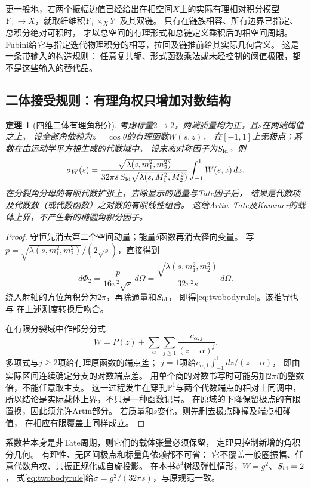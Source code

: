 \documentclass[11pt,a4paper]{ctexart}
\theoremstyle{cnplain}\newtheorem{theorem}{定理}[section]
\theoremstyle{definition}\newtheorem{definition}[theorem]{定义}
\theoremstyle{remark}\newtheorem{remark}[theorem]{注}
\begin{document}
更一般地，若两个振幅边值已经给出在相空间$X$上的实际有理相对积分模型
$Y_\pm\to X$，就取纤维积$Y_+\times_XY_-$及其双链。
只有在链族相容、所有边界已指定、总积分绝对可积时，
才以总空间的有理形式和总链定义乘积后的相空间周期。
Fubini给它与指定迭代物理积分的相等，拉回及链推前给其实际几何含义。
这是一条带输入的构造规则：
任意复共轭、形式函数乘法或未经控制的阈值极限，都不是这些输入的替代品。

\subsection{二体接受规则：有理角权只增加对数结构}
\begin{theorem}[四维二体有理角积分]\label{thm:twobodyrational}
考虑标量$2\to2$，两端质量均为正，且$s$在两端阈值之上。
设全部角依赖为$z=\cos\theta$的有理函数$W(s,z)$，
在$[-1,1]$上无极点；系数在由运动学平方根生成的代数域中。
设末态对称因子为$S_{\rm id}$。则
\begin{equation}\label{eq:twobodyrule}
 \sigma_W(s)=
 \frac{\sqrt{\lambda(s,m_1^2,m_2^2)}}
 {32\pi s\,S_{\rm id}\sqrt{\lambda(s,M_1^2,M_2^2)}}
 \int_{-1}^1 W(s,z)\,dz .
\end{equation}
在分裂角分母的有限代数扩张上，去除显示的通量与Tate因子后，
结果是代数项及代数数（或代数函数）之对数的有限线性组合。
这给Artin--Tate及Kummer的载体上界，不产生新的椭圆角积分因子。
\end{theorem}
\begin{proof}
守恒先消去第二个空间动量；能量$\delta$函数再消去径向变量。
写$p=\sqrt{\lambda(s,m_1^2,m_2^2)}/(2\sqrt s)$，直接得到
\[
 d\Phi_2=\frac{p}{16\pi^2\sqrt s}\,d\Omega
        =\frac{\sqrt{\lambda(s,m_1^2,m_2^2)}}{32\pi^2s}\,d\Omega .
\]
绕入射轴的方位角积分为$2\pi$，再除通量和$S_{\rm id}$，
即得\eqref{eq:twobodyrule}。该推导也与
\cite[式(49.16)--(49.18)]{PDGphase}在上述测度转换后吻合。

在有限分裂域中作部分分式
\[
 W=P(z)+\sum_{\alpha}\sum_{j\ge1}\frac{c_{\alpha,j}}{(z-\alpha)^j}.
\]
多项式与$j\ge2$项给有理原函数的端点差；
$j=1$项给$c_{\alpha,1}\int_{-1}^1dz/(z-\alpha)$，
即由实际区间连续确定分支的对数端点差。
用单个商的对数书写时可能另加$2\pi i$的整数倍，不能任意取主支。
这一过程发生在穿孔$\mathbb P^1$与两个代数端点的相对上同调中，
所以结论是实际载体上界，不只是一种函数记号。
在原域的下降保留极点的有限置换，因此须允许Artin部分。
若质量和$s$变化，则先删去极点碰撞及端点相碰值，
在相应有限覆盖上同样成立。
\end{proof}

系数若本身是非Tate周期，则它们的载体张量必须保留，
定理只控制新增的角积分几何。
有理性、无区间极点和标量角依赖都不可省：
它不覆盖一般圈振幅、任意代数角权、共振正规化或自旋投影。
在本书$\phi^4$树级弹性情形，$W=g^2$、$S_{\rm id}=2$，
式\eqref{eq:twobodyrule}给$\sigma=g^2/(32\pi s)$，与原规范一致。
\end{document}
